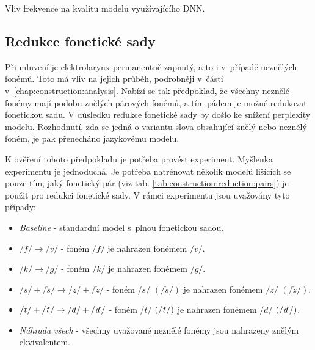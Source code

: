\begin{table}[htpb]
  \centering
  \def\arraystretch{1.5}
  \caption{Vliv frekvence na kvalitu modelu využívajícího DNN.}
  \label{tab:construction:experiment:dnn}
\end{table}

\subsection{Redukce fonetické sady}
\label{chap:construction:results:reduction}

Při mluvení je elektrolarynx permanentně zapnutý, a to i v~případě neznělých fonémů.
Toto má vliv na jejich průběh, podrobněji v~části v~\ref{chap:construction:analysis}.
Nabízí se tak předpoklad, že všechny neznělé fonémy mají podobu znělých párových fonémů, a tím pádem je možné redukovat fonetickou sadu.
V důsledku redukce fonetické sady by došlo ke snížení perplexity modelu.
Rozhodnutí, zda se jedná o variantu slova obsahující znělý nebo neznělý foném, je pak přenecháno jazykovému modelu.

K ověření tohoto předpokladu je potřeba provést experiment.
Myšlenka experimentu je jednoduchá.
Je potřeba natrénovat několik modelů lišících se pouze tím, jaký fonetický pár (viz tab. \ref{tab:construction:reduction:pairs}) je použit pro redukci fonetické sady.
V rámci experimentu jsou uvažovány tyto případy:

\begin{itemize}
  \item \textit{Baseline} - standardní model s~plnou fonetickou sadou.
  \item $/f/ \rightarrow /v/$ - foném $/f/$ je nahrazen fonémem $/v/$.
  \item $/k/ \rightarrow /g/$ - foném $/k/$ je nahrazen fonémem $/g/$.
  \item $/s/+/\check{s}/ \rightarrow /z/+/\check{z}/$ - foném $/s/$ $\left(/\check{s}/\right)$ je nahrazen fonémem $/z/$ $\left(/\check{z}/\right)$.
  \item $/t/+/\text{\textit{ť}}/ \rightarrow /d/+/\text{\textit{ď}}/$ - foném $/t/$ $\left(/\text{\textit{ť}}/\right)$ je nahrazen fonémem $/d/$ $\left(/\text{\textit{ď}}/\right)$.
  \item \textit{Náhrada všech} - všechny uvažované neznělé fonémy jsou nahrazeny znělým ekvivalentem.
\end{itemize}

